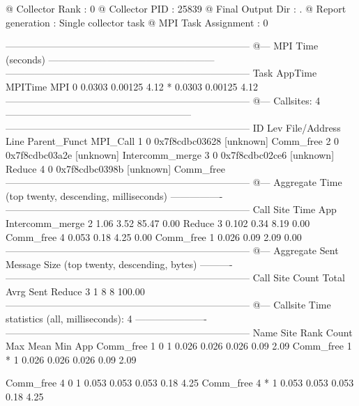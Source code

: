 \begin{Output}
@ Collector Rank           : 0
@ Collector PID            : 25839
@ Final Output Dir         : .
@ Report generation        : Single collector task
@ MPI Task Assignment      : 0

---------------------------------------------------------------------------
@--- MPI Time (seconds) ---------------------------------------------------
---------------------------------------------------------------------------
Task  AppTime   MPITime     MPI%
0     0.0303    0.00125     4.12
*     0.0303    0.00125     4.12
---------------------------------------------------------------------------
@--- Callsites: 4 ---------------------------------------------------------
---------------------------------------------------------------------------
ID Lev File/Address        Line Parent_Funct             MPI_Call
1   0 0x7f8cdbc03628           [unknown]                Comm_free
2   0 0x7f8cdbc03a2e           [unknown]                Intercomm_merge
3   0 0x7f8cdbc02ce6           [unknown]                Reduce
4   0 0x7f8cdbc0398b           [unknown]                Comm_free
---------------------------------------------------------------------------
@--- Aggregate Time (top twenty, descending, milliseconds) ----------------
---------------------------------------------------------------------------
Call                 Site       Time    App%
Intercomm_merge         2       1.06    3.52   85.47    0.00
Reduce                  3      0.102    0.34    8.19    0.00
Comm_free               4      0.053    0.18    4.25    0.00
Comm_free               1      0.026    0.09    2.09    0.00
---------------------------------------------------------------------------
@--- Aggregate Sent Message Size (top twenty, descending, bytes) ----------
---------------------------------------------------------------------------
Call                 Site      Count      Total       Avrg  Sent%
Reduce                  3          1          8          8 100.00
---------------------------------------------------------------------------
@--- Callsite Time statistics (all, milliseconds): 4 ----------------------
---------------------------------------------------------------------------
Name              Site Rank  Count      Max     Mean      Min   App%
Comm_free            1    0      1    0.026    0.026    0.026   0.09   2.09
Comm_free            1    *      1    0.026    0.026    0.026   0.09   2.09

Comm_free            4    0      1    0.053    0.053    0.053   0.18   4.25
Comm_free            4    *      1    0.053    0.053    0.053   0.18   4.25


\end{Output}
